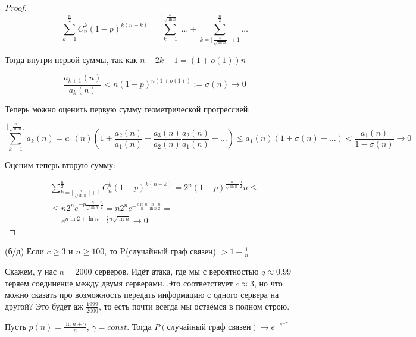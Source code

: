 \begin{proof}
\[
\sum_{k = 1}^{\frac{n}{2}} C_n^k(1-p)^{k(n-k)} = \sum_{k = 1}^{\lfloor{\frac{n}{\sqrt{\ln{n}}}} \rfloor}\dots + \sum_{k = \lfloor \frac{n}{\sqrt{\ln{n}}} \rfloor + 1}^\frac{n}{2} \dots

\]

Тогда внутри первой суммы, так как $n-2k-1 = (1+o(1))n$ 


\[
\frac{a_{k+1}(n)}{a_k(n)} < n(1-p)^{n(1+o(1))} := \sigma(n) \to 0 
\]

Теперь можно оценить первую сумму геометрической прогрессией:

\[
\sum_{k = 1}^{\lfloor{\frac{n}{\sqrt{\ln{n}}}} \rfloor} a_k(n) =
a_1(n)(1+\frac{a_2(n)}{a_1(n)} + 
\frac{a_3(n)}{a_2(n)} \frac{a_2(n)}{a_1(n)} + \dots) \leq a_1(n)(1 + \sigma(n)+\dots ) < \frac{a_1(n)}{1-\sigma(n)} \to 0

\]

Оценим теперь вторую сумму:

\begin{multline*}
    \sum_{k = \lfloor \frac{n}{\sqrt{\ln{n}}} \rfloor + 1}^\frac{n}{2} C_n^k(1-p)^{k(n-k)} = 2^n (1-p)^{\frac{n}{\sqrt{\ln{n}}} \frac{n}{2}}n  \leq \\ \leq n 2^n e^{-p \frac{n}{\sqrt{\ln{n}}} \frac{n}{2}} = 
n 2^n e^{-\frac{c\ln{n}}{n} \frac{n}{\ln{n}} \frac{n}{2}}=\\ = e^{n\ln{2} + \ln{n} - \frac{c}{2} n \sqrt{\ln{n}}} \to 0
\end{multline*}

\end{proof}

\begin{theorem}(б/д)
Если $c \geq 3$ и $n \geq 100$, то P(случайный граф связен) $>1 -\frac{1}{n}$
\end{theorem}

\begin{note}
     Скажем, у нас $n = 2000$ серверов. Идёт атака, где мы с вероятностью $q \approx 0.99$ теряем соединение между двумя серверами. Это соответствует $c \approx 3$, но что можно сказать про возможность передать информацию с одного сервера на другой? Это будет аж $\frac{1999}{2000}$, то есть почти всегда мы остаёмся в полном строю.
\end{note}

\begin{proposition}
Пусть $p(n) = \frac{\ln{n} + \gamma}{n}$, $\gamma = const$. Тогда $P(\text{случайный граф связен}) \to e^{-e^{-\gamma}}$
\end{proposition}


